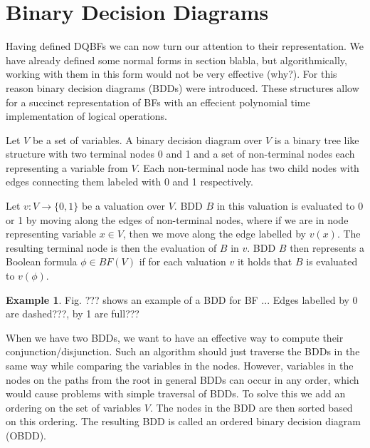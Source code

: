 \documentclass[
  digital, %
  twoside, %
  table,   %
  nolof,     %
  nolot,     %
]{fithesis3}
\theoremstyle{definition}
\newtheorem{example}{Example}
\theoremstyle{remark}
\newcommand{\BF}[1]{BF(#1)}
\begin{document}
\section{Binary Decision Diagrams}
Having defined DQBFs we can now turn our attention to their representation. We have already defined some normal forms in section blabla, but algorithmically, working with them in this form would not be very effective (why?). For this reason binary decision diagrams (BDDs) were introduced. These structures allow for a succinct representation of BFs with an effecient polynomial time implementation of logical operations.

Let $V$ be a set of variables. A binary decision diagram over $V$ is a binary tree like structure with two terminal nodes 0 and 1 and a set of non-terminal nodes each representing a variable from $V$. Each non-terminal node has two child nodes with edges connecting them labeled with 0 and 1 respectively.


Let $v\colon V \to \{0,1\}$ be a valuation over $V$. BDD $B$ in this valuation is evaluated to 0 or 1 by moving along the edges of non-terminal nodes, where if we are in node representing variable $x \in V$, then we move along the edge labelled by $v(x)$. The resulting terminal node is then the evaluation of $B$ in $v$. BDD $B$ then represents a Boolean formula $\phi \in \BF{V}$ if for each valuation $v$ it holds that $B$ is evaluated to $v(\phi)$.

\begin{example}
Fig. ??? shows an example of a BDD for BF ... Edges labelled by 0 are dashed???, by 1 are full??? 
\end{example}

When we have two BDDs, we want to have an effective way to compute their conjunction/disjunction. Such an algorithm should just traverse the BDDs in the same way while comparing the variables in the nodes. However, variables in the nodes on the paths from the root in general BDDs can occur in any order, which would cause problems with simple traversal of BDDs. To solve this we add an ordering on the set of variables $V$. The nodes in the BDD are then sorted based on this ordering. The resulting BDD is called an ordered binary decision diagram (OBDD).
\end{document}
